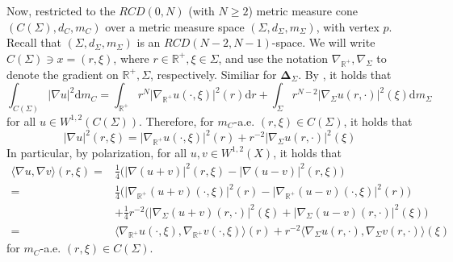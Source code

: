 \documentclass{article}
\theoremstyle{remark}
\numberwithin{equation}{section}
\theoremstyle{definition}
\begin{document}
     Now, restricted to the $RCD(0,N)$ (with $N \ge 2$) metric measure cone $(C(\Sigma),d_{C},m_{C})$ over a metric measure space $(\Sigma,d_{\Sigma},m_{\Sigma})$, with vertex $p$. Recall that $(\Sigma,d_{\Sigma},m_{\Sigma})$ is an $RCD(N-2,N-1)$-space. We will write $C(\Sigma) \ni x = (r,\xi)$, where $r \in \mathbb{R}^{+}, \xi \in \Sigma$, and use the notation $\nabla_{\mathbb{R}^{+}}, \nabla_{\Sigma}$ to denote the gradient on $\mathbb{R}^{+},\Sigma$, respectively. Similiar for $\mathbf{\Delta}_{\Sigma}$. By \cite[Proposition 3.4]{Ketterer_2015}, it holds that
     \begin{equation}
     	\int_{C(\Sigma)} \lvert \nabla u \rvert^{2} \mathrm{d}m_{C} = \int_{\mathbb{R}^{+}} r^{N} \lvert \nabla_{\mathbb{R}^{+}} u(\cdot,\xi) \rvert^{2}(r) \mathrm{d}r + \int_{\Sigma} r^{N-2} \lvert \nabla_{\Sigma} u(r,\cdot) \rvert^{2}(\xi) \mathrm{d}m_{\Sigma}
     \end{equation}
     for all $u \in W^{1,2}(C(\Sigma))$. Therefore, for $m_{C}$-a.e. $(r,\xi) \in C(\Sigma)$, it holds that
     \begin{equation}
     	\lvert \nabla u \rvert^{2}(r,\xi) = \lvert \nabla_{\mathbb{R}^{+}} u(\cdot,\xi) \rvert^{2}(r) + r^{-2} \lvert \nabla_{\Sigma} u(r,\cdot) \rvert^{2}(\xi)
     \end{equation}
     In particular, by polarization, for all $u,v \in W^{1,2}(X)$, it holds that
     \begin{equation}
     	\begin{split}
     		\langle \nabla u, \nabla v \rangle (r,\xi) = & \frac{1}{4} \Big( \lvert \nabla (u + v) \rvert^{2}(r,\xi) - \lvert \nabla (u - v) \rvert^{2}(r,\xi) \Big)\\
     		= & \frac{1}{4} \Big( \lvert \nabla_{\mathbb{R}^{+}} (u + v)(\cdot,\xi) \rvert^{2}(r) - \lvert \nabla_{\mathbb{R}^{+}} (u - v)(\cdot,\xi) \rvert^{2}(r) \Big)\\
     		& + \frac{1}{4} r^{-2} \Big( \lvert \nabla_{\Sigma} (u + v)(r,\cdot) \rvert^{2}(\xi) + \lvert \nabla_{\Sigma} (u - v)(r,\cdot) \rvert^{2}(\xi) \Big)\\
     		= & \langle \nabla_{\mathbb{R}^{+}} u(\cdot,\xi), \nabla_{\mathbb{R}^{+}} v(\cdot,\xi) \rangle (r) + r^{-2} \langle \nabla_{\Sigma} u(r,\cdot), \nabla_{\Sigma} v(r,\cdot) \rangle (\xi)
     	\end{split}
     \end{equation}
     for $m_{C}$-a.e. $(r,\xi) \in C(\Sigma)$.
     
\end{document}
